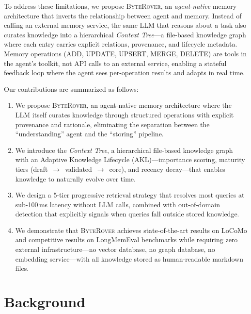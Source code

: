 \documentclass[11pt]{article}
\newcommand{\byterover}{\textsc{ByteRover}}
\newcommand{\contexttree}{\textit{Context Tree}}
\begin{document}
To address these limitations, we propose \byterover{}, an \emph{agent-native} memory architecture
that inverts the relationship between agent and memory.
Instead of calling an external memory service, the same LLM that reasons about a task
also curates knowledge into a hierarchical \contexttree{}---a file-based knowledge graph
where each entry carries explicit relations, provenance, and lifecycle metadata.
Memory operations (ADD, UPDATE, UPSERT, MERGE, DELETE) are tools in the agent's toolkit,
not API calls to an external service, enabling a stateful feedback loop
where the agent sees per-operation results and adapts in real time.

Our contributions are summarized as follows:

\begin{enumerate}[leftmargin=*]
  \item We propose \byterover{}, an agent-native memory architecture where the LLM itself curates knowledge
    through structured operations with explicit provenance and rationale,
    eliminating the separation between the ``understanding'' agent and the ``storing'' pipeline.

  \item We introduce the \contexttree{}, a hierarchical file-based knowledge graph
    with an Adaptive Knowledge Lifecycle (AKL)---importance scoring, maturity tiers (draft~$\to$~validated~$\to$~core),
    and recency decay---that enables knowledge to naturally evolve over time.

  \item We design a 5-tier progressive retrieval strategy that resolves most queries
    at sub-100\,ms latency without LLM calls, combined with out-of-domain detection
    that explicitly signals when queries fall outside stored knowledge.

  \item We demonstrate that \byterover{} achieves state-of-the-art results on LoCoMo and competitive
    results on LongMemEval benchmarks while requiring zero external infrastructure---no vector database, no graph database,
    no embedding service---with all knowledge stored as human-readable markdown files.
\end{enumerate}


\section{Background}
\label{sec:background}
\end{document}
